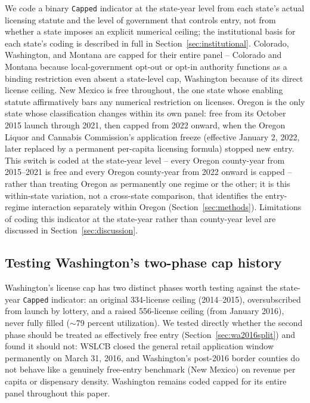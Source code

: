 \documentclass[12pt]{article}
\begin{document}
We code a binary \texttt{Capped} indicator at the state-year level from each state's actual licensing statute
and the level of government that controls entry, not from whether a state imposes an explicit numerical
ceiling; the institutional basis for each state's coding is described in full in
Section~\ref{sec:institutional}. Colorado, Washington, and Montana are capped for their entire panel --
Colorado and Montana because local-government opt-out or opt-in authority functions as a binding restriction
even absent a state-level cap, Washington because of its direct license ceiling. New Mexico is free throughout,
the one state whose enabling statute affirmatively bars any numerical restriction on licenses. Oregon is the
only state whose classification changes within its own panel: free from its October 2015 launch through 2021,
then capped from 2022 onward, when the Oregon Liquor and Cannabis Commission's application freeze (effective
January 2, 2022, later replaced by a permanent per-capita licensing formula) stopped new entry. This switch is
coded at the state-year level -- every Oregon county-year from 2015--2021 is free and every Oregon county-year
from 2022 onward is capped -- rather than treating Oregon as permanently one regime or the other; it is this
within-state variation, not a cross-state comparison, that identifies the entry-regime interaction separately
within Oregon (Section~\ref{sec:methods}). Limitations of coding this indicator at the state-year rather than
county-year level are discussed in Section~\ref{sec:discussion}.

\subsection{Testing Washington's two-phase cap history}
\label{sec:localbarrier}

Washington's license cap has two distinct phases worth testing against the state-year \texttt{Capped}
indicator: an original 334-license ceiling (2014--2015), oversubscribed from launch by lottery, and a raised
556-license ceiling (from January 2016), never fully filled ($\sim$79 percent utilization). We tested directly
whether the second phase should be treated as effectively free entry (Section~\ref{sec:wa2016split}) and found
it should not: WSLCB closed the general retail application window permanently on March 31, 2016, and
Washington's post-2016 border counties do not behave like a genuinely free-entry benchmark (New Mexico) on
revenue per capita or dispensary density. Washington remains coded capped for its entire panel throughout this
paper.
\end{document}
